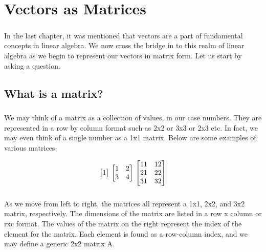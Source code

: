 \documentclass[12pt, letterpaper]{report}
\begin{document}
	\chapter{Vectors as Matrices}
	\paragraph{} In the last chapter, it was mentioned that vectors are a part of fundamental concepts in linear algebra. We now cross the bridge in to this realm of linear algebra as we begin to represent our vectors in matrix form. Let us start by asking a question.

		\section{What is a matrix?}
		\paragraph{} We may think of a matrix as a collection of values, in our case numbers. They are represented in a row by column format such as 2x2 or 3x3 or 2x3 etc. In fact, we may even think of a single number as a 1x1 matrix. Below are some examples of various matrices.

		\begin{equation*}
		\begin{bmatrix}
		1 
		\end{bmatrix}
\\
		\begin{bmatrix}
		1 & 2\\
		3 & 4
		\end{bmatrix}
\\
		\begin{bmatrix}
		11 & 12\\
		21 & 22\\
		31 & 32
		\end{bmatrix}
		\end{equation*}
		
		\paragraph{} As we move from left to right, the matrices all represent a 1x1, 2x2, and 3x2 matrix, respectively. The dimensions of the matrix are listed in a row x column or rxc format. The values of the matrix on the right represent the index of the element for the matrix. Each element is found as a row-column index, and we may define a generic 2x2 matrix A.
\end{document}
